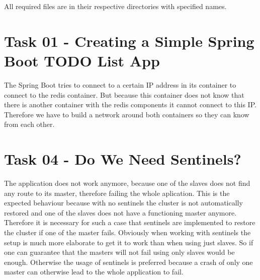 \documentclass{article}
\begin{document}
	\pagestyle{fancy}
	
	All required files are in their respective directories with specified names.	
	
	\section*{Task 01 - Creating a Simple Spring Boot TODO List App}
	\begin{adjustwidth}{2em}{2em}
		The Spring Boot tries to connect to a certain IP address in its container to connect to the redis container. But because this container does not know that there is another container with the redis components it cannot connect to this IP. Therefore we have to build a network around both containers so they can know from each other.
	\end{adjustwidth}
	
	\section*{Task 04 - Do We Need Sentinels?}
	\begin{adjustwidth}{2em}{2em}
		The application does not work anymore, because one of the slaves does not find any route to its master, therefore failing the whole aplication. This is the expected behaviour because with no sentinels the cluster is not automatically restored and one of the slaves does not have a functioning master anymore. \\
		Therefore it is necessary for such a case that sentinels are implemented to restore the cluster if one of the master fails. Obviously when working with sentinels the setup is much more elaborate to get it to work than when using just slaves. So if one can guarantee that the masters will not fail using only slaves would be enough. Otherwise the usage of sentinels is preferred because a crash of only one master can otherwise lead to the whole application to fail.
	\end{adjustwidth}
\end{document}
